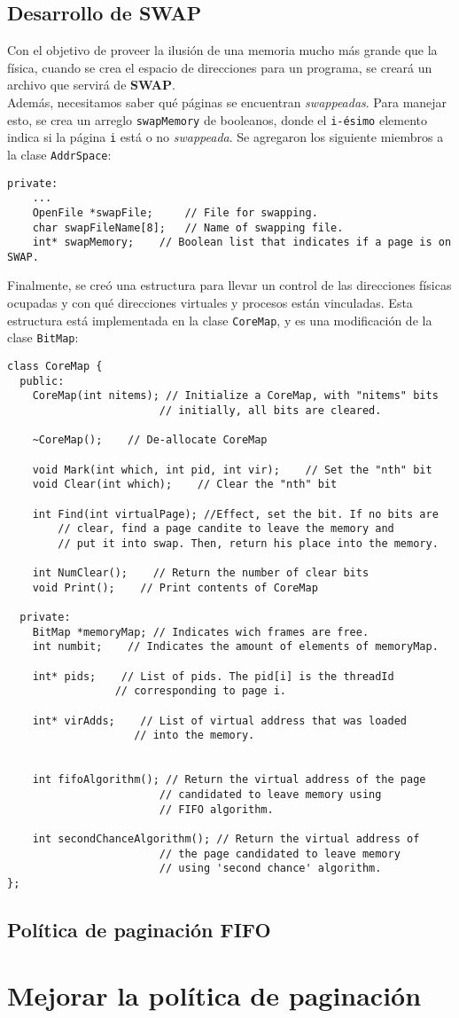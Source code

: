 \subsection*{Desarrollo de SWAP}
Con el objetivo de proveer la ilusión de una memoria mucho más grande que la física, cuando se crea el espacio de direcciones para un programa, se creará un archivo que servirá de \textbf{SWAP}.\\
Además, necesitamos saber qué páginas se encuentran \textit{swappeadas}. Para manejar esto, se crea un arreglo \texttt{swapMemory} de booleanos, donde el \texttt{i-ésimo} elemento indica si la página \texttt{i} está o no \textit{swappeada}.\newpage
Se agregaron los siguiente miembros a la clase \texttt{AddrSpace}:
\begin{lstlisting}[style=C]
private:
    ...
    OpenFile *swapFile;     // File for swapping.
    char swapFileName[8];   // Name of swapping file.
    int* swapMemory;    // Boolean list that indicates if a page is on SWAP.
\end{lstlisting}
Finalmente, se creó una estructura para llevar un control de las direcciones físicas ocupadas y con qué direcciones virtuales y procesos están vinculadas. Esta estructura está implementada en la clase \texttt{CoreMap}, y es una modificación de la clase \texttt{BitMap}:
\begin{lstlisting}[style=C]
class CoreMap {
  public:
    CoreMap(int nitems); // Initialize a CoreMap, with "nitems" bits
                        // initially, all bits are cleared.

    ~CoreMap();    // De-allocate CoreMap
    
    void Mark(int which, int pid, int vir);    // Set the "nth" bit
    void Clear(int which);    // Clear the "nth" bit

    int Find(int virtualPage); //Effect, set the bit. If no bits are
        // clear, find a page candite to leave the memory and
        // put it into swap. Then, return his place into the memory.
    
    int NumClear();    // Return the number of clear bits
    void Print();    // Print contents of CoreMap
    
  private:
    BitMap *memoryMap; // Indicates wich frames are free.
    int numbit;    // Indicates the amount of elements of memoryMap.

    int* pids;    // List of pids. The pid[i] is the threadId
                 // corresponding to page i.
    
    int* virAdds;    // List of virtual address that was loaded
                    // into the memory.


    int fifoAlgorithm(); // Return the virtual address of the page 
                        // candidated to leave memory using
                        // FIFO algorithm.

    int secondChanceAlgorithm(); // Return the virtual address of
                        // the page candidated to leave memory
                        // using 'second chance' algorithm.
};
\end{lstlisting}
\subsection*{Política de paginación FIFO}
\section{Mejorar la política de paginación}